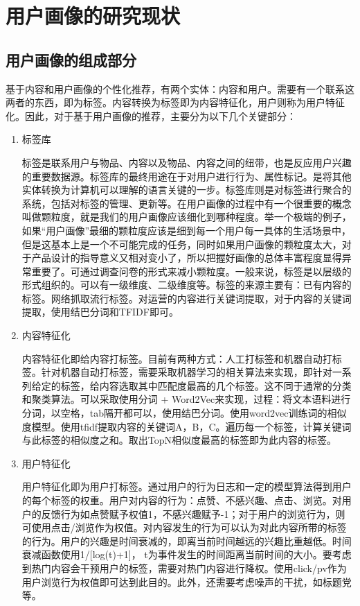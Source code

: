 	\section{用户画像的研究现状}
		\subsection{用户画像的组成部分}
		基于内容和用户画像的个性化推荐，有两个实体：内容和用户。需要有一个联系这两者的东西，即为标签。内容转换为标签即为内容特征化，用户则称为用户特征化。因此，对于基于用户画像的推荐，主要分为以下几个关键部分：
		\begin{enumerate}[(1)]
		\item 标签库

		标签是联系用户与物品、内容以及物品、内容之间的纽带，也是反应用户兴趣的重要数据源。标签库的最终用途在于对用户进行行为、属性标记。是将其他实体转换为计算机可以理解的语言关键的一步。标签库则是对标签进行聚合的系统，包括对标签的管理、更新等。在用户画像的过程中有一个很重要的概念叫做颗粒度，就是我们的用户画像应该细化到哪种程度。举一个极端的例子，如果“用户画像”最细的颗粒度应该是细到每一个用户每一具体的生活场景中，但是这基本上是一个不可能完成的任务，同时如果用户画像的颗粒度太大，对于产品设计的指导意义又相对变小了，所以把握好画像的总体丰富程度显得异常重要了。可通过调查问卷的形式来减小颗粒度。一般来说，标签是以层级的形式组织的。可以有一级维度、二级维度等。标签的来源主要有：已有内容的标签。网络抓取流行标签。对运营的内容进行关键词提取，对于内容的关键词提取，使用结巴分词和TFIDF即可。
		\item 内容特征化

		内容特征化即给内容打标签。目前有两种方式：人工打标签和机器自动打标签。针对机器自动打标签，需要采取机器学习的相关算法来实现，即针对一系列给定的标签，给内容选取其中匹配度最高的几个标签。这不同于通常的分类和聚类算法。可以采取使用分词 + Word2Vec来实现，过程：将文本语料进行分词，以空格，tab隔开都可以，使用结巴分词。使用word2vec训练词的相似度模型。使用tfidf提取内容的关键词A，B，C。遍历每一个标签，计算关键词与此标签的相似度之和。取出TopN相似度最高的标签即为此内容的标签。
		\item 用户特征化

		用户特征化即为用户打标签。通过用户的行为日志和一定的模型算法得到用户的每个标签的权重。用户对内容的行为：点赞、不感兴趣、点击、浏览。对用户的反馈行为如点赞赋予权值1，不感兴趣赋予-1；对于用户的浏览行为，则可使用点击/浏览作为权值。对内容发生的行为可以认为对此内容所带的标签的行为。用户的兴趣是时间衰减的，即离当前时间越远的兴趣比重越低。时间衰减函数使用1/[log(t)+1]， t为事件发生的时间距离当前时间的大小。要考虑到热门内容会干预用户的标签，需要对热门内容进行降权。使用click/pv作为用户浏览行为权值即可达到此目的。此外，还需要考虑噪声的干扰，如标题党等。
		\end{enumerate}

